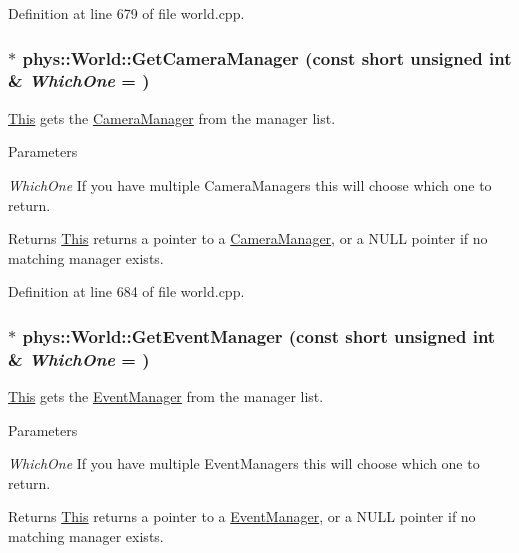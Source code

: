 Definition at line 679 of file world.cpp.

\hypertarget{classphys_1_1World_a33ab68866da54b7f8f766d5d29171fb7}{
\subsubsection[{GetCameraManager}]{ $\ast$ phys::World::GetCameraManager (const short unsigned int \& {\em WhichOne} = {})}}
\label{da/ddf/classphys_1_1World_a33ab68866da54b7f8f766d5d29171fb7}


\hyperlink{structThis}{This} gets the \hyperlink{classphys_1_1CameraManager}{CameraManager} from the manager list. 


\begin{DoxyParams}{Parameters}
\item[{\em WhichOne}]If you have multiple CameraManagers this will choose which one to return. \end{DoxyParams}
\begin{DoxyReturn}{Returns}
\hyperlink{structThis}{This} returns a pointer to a \hyperlink{classphys_1_1CameraManager}{CameraManager}, or a NULL pointer if no matching manager exists. 
\end{DoxyReturn}


Definition at line 684 of file world.cpp.

\hypertarget{classphys_1_1World_ac20a304413b4d47f9ae657983e903a67}{
\subsubsection[{GetEventManager}]{ $\ast$ phys::World::GetEventManager (const short unsigned int \& {\em WhichOne} = {})}}
\label{da/ddf/classphys_1_1World_ac20a304413b4d47f9ae657983e903a67}


\hyperlink{structThis}{This} gets the \hyperlink{classphys_1_1EventManager}{EventManager} from the manager list. 


\begin{DoxyParams}{Parameters}
\item[{\em WhichOne}]If you have multiple EventManagers this will choose which one to return. \end{DoxyParams}
\begin{DoxyReturn}{Returns}
\hyperlink{structThis}{This} returns a pointer to a \hyperlink{classphys_1_1EventManager}{EventManager}, or a NULL pointer if no matching manager exists. 
\end{DoxyReturn}



